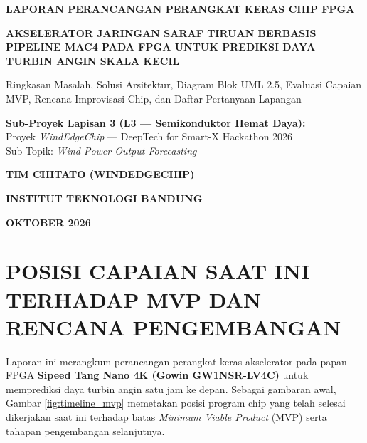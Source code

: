 \documentclass[12pt,a4paper]{article}
\begin{document}
\begin{titlepage}
    \centering
    \vspace*{1.5cm}
    {\large\bfseries LAPORAN PERANCANGAN PERANGKAT KERAS CHIP FPGA\par}
    \vspace{0.7cm}
    {\large\bfseries AKSELERATOR JARINGAN SARAF TIRUAN BERBASIS PIPELINE MAC4 PADA FPGA UNTUK PREDIKSI DAYA TURBIN ANGIN SKALA KECIL\par}
    \vspace{1.0cm}
    {\normalsize Ringkasan Masalah, Solusi Arsitektur, Diagram Blok UML 2.5, Evaluasi Capaian MVP, Rencana Improvisasi Chip, dan Daftar Pertanyaan Lapangan\par}
    \vspace{2.4cm}
    
    \begin{minipage}{0.85\textwidth}
        \centering
        \textbf{Sub-Proyek Lapisan 3 (L3 — Semikonduktor Hemat Daya):}\\
        Proyek \textit{WindEdgeChip} — DeepTech for Smart-X Hackathon 2026\\
        Sub-Topik: \textit{Wind Power Output Forecasting}
    \end{minipage}
    
    \vfill
    {\bfseries TIM CHITATO (WINDEDGECHIP)\par}
    {\bfseries INSTITUT TEKNOLOGI BANDUNG\par}
    {\bfseries OKTOBER 2026\par}
\end{titlepage}

\newpage
{}

\section{POSISI CAPAIAN SAAT INI TERHADAP MVP DAN RENCANA PENGEMBANGAN}

Laporan ini merangkum perancangan perangkat keras akselerator pada papan FPGA \textbf{Sipeed Tang Nano 4K (Gowin GW1NSR-LV4C)} untuk memprediksi daya turbin angin satu jam ke depan. Sebagai gambaran awal, Gambar \ref{fig:timeline_mvp} memetakan posisi program chip yang telah selesai dikerjakan saat ini terhadap batas \textit{Minimum Viable Product} (MVP) serta tahapan pengembangan selanjutnya.
\end{document}
